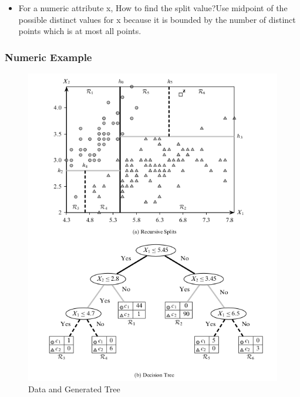 \begin{itemize}
    \item For a numeric attribute x, How to find the split value?Use midpoint of the possible distinct values for x because it is bounded by the number of distinct points which is at most all points. 
\end{itemize}

\subsubsection{Numeric Example}
\begin{figure}[H]
\centerline{\includegraphics[width=\textwidth]{Figures/dt8}}
\caption{\label{fig:figure}Data and Generated Tree}
\end{figure}
